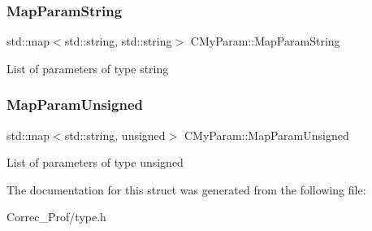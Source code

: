 \subsubsection{\texorpdfstring{Map\+Param\+String}{MapParamString}}
{\footnotesize\ttfamily std\+::map$<$std\+::string, std\+::string$>$ C\+My\+Param\+::\+Map\+Param\+String}

List of parameters of type string \mbox{\label{struct_c_my_param_aece7d4bdf4103e359f769d08e97a459d}} 
\subsubsection{\texorpdfstring{Map\+Param\+Unsigned}{MapParamUnsigned}}
{\footnotesize\ttfamily std\+::map$<$std\+::string, unsigned$>$ C\+My\+Param\+::\+Map\+Param\+Unsigned}

List of parameters of type unsigned 

The documentation for this struct was generated from the following file\+:\begin{DoxyCompactItemize}
\item 
Correc\+\_\+\+Prof/type.\+h\end{DoxyCompactItemize}
